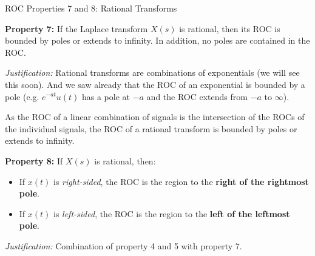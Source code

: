 \begin{frame}{ROC Properties 7 and 8: Rational Transforms}
    \begin{tcolorbox}[colframe=PrimaryColor, colback=PrimaryColor!10]
        \textbf{Property 7:} If the Laplace transform $X(s)$ is rational, then its ROC is bounded by poles or extends to infinity. In addition, no poles are contained in the ROC.
    \end{tcolorbox}
    \vspace{0.1cm}
    \textit{Justification:} Rational transforms are combinations of exponentials (we will see this soon).
    And we saw already that the ROC of an exponential is bounded by a pole
    (e.g. $e^{-at}u(t)$ has a pole at $-a$ and the ROC extends from $-a$ to $\infty$).

    As the ROC of a linear combination of signals is the intersection of the ROCs of the individual signals,
    the ROC of a rational transform is bounded by poles or extends to infinity.
    \vspace{0.1cm}

    \begin{tcolorbox}[colframe=PrimaryColor, colback=PrimaryColor!10]
        \textbf{Property 8:} If $X(s)$ is rational, then:
        \begin{itemize}
            \item If $x(t)$ is \textit{right-sided}, the ROC is the region to the \textbf{right of the rightmost pole}.
            \item If $x(t)$ is \textit{left-sided}, the ROC is the region to the \textbf{left of the leftmost pole}.
        \end{itemize}
    \end{tcolorbox}
    \textit{Justification:} Combination of property 4 and 5 with property 7.
\end{frame}

